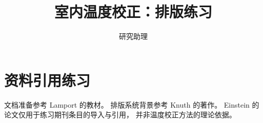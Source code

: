 \documentclass[UTF8,fontset=fandol,a4paper,11pt]{ctexart}
\title{室内温度校正：排版练习}
\author{研究助理}
\date{}
\begin{document}
\maketitle
\section{资料引用练习}
文档准备参考 Lamport 的教材\cite{lamport1994}。
排版系统背景参考 Knuth 的著作\cite{knuth1984}。
Einstein 的论文\cite{einstein1905}仅用于练习期刊条目的导入与引用，
并非温度校正方法的理论依据。
\printbibliography[title={参考文献}]
\end{document}
